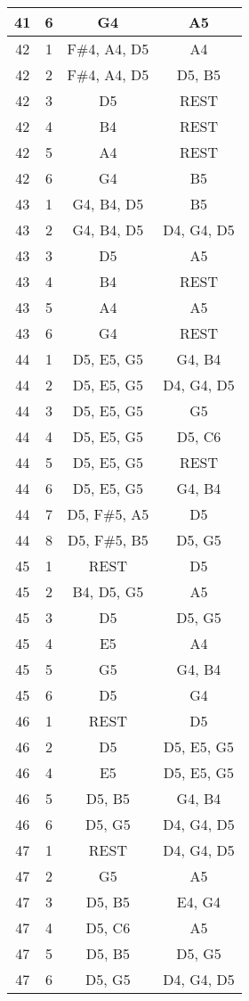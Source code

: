 \documentclass{article}
\begin{document}
\begin{longtable}{|c|c|c|c|}
41 & 6 & G4 & A5 \\ 
\hline
42 & 1 & F\#4, A4, D5 & A4 \\ 
42 & 2 & F\#4, A4, D5 & D5, B5 \\ 
42 & 3 & D5 & REST \\ 
42 & 4 & B4 & REST \\ 
42 & 5 & A4 & REST \\ 
42 & 6 & G4 & B5 \\ 
\hline
43 & 1 & G4, B4, D5 & B5 \\ 
43 & 2 & G4, B4, D5 & D4, G4, D5 \\ 
43 & 3 & D5 & A5 \\ 
43 & 4 & B4 & REST \\ 
43 & 5 & A4 & A5 \\ 
43 & 6 & G4 & REST \\ 
\hline
44 & 1 & D5, E5, G5 & G4, B4 \\ 
44 & 2 & D5, E5, G5 & D4, G4, D5 \\ 
44 & 3 & D5, E5, G5 & G5 \\ 
44 & 4 & D5, E5, G5 & D5, C6 \\ 
44 & 5 & D5, E5, G5 & REST \\ 
44 & 6 & D5, E5, G5 & G4, B4 \\ 
44 & 7 & D5, F\#5, A5 & D5 \\ 
44 & 8 & D5, F\#5, B5 & D5, G5 \\ 
\hline
45 & 1 & REST & D5 \\ 
45 & 2 & B4, D5, G5 & A5 \\ 
45 & 3 & D5 & D5, G5 \\ 
45 & 4 & E5 & A4 \\ 
45 & 5 & G5 & G4, B4 \\ 
45 & 6 & D5 & G4 \\ 
\hline
46 & 1 & REST & D5 \\ 
46 & 2 & D5 & D5, E5, G5 \\ 
46 & 4 & E5 & D5, E5, G5 \\ 
46 & 5 & D5, B5 & G4, B4 \\ 
46 & 6 & D5, G5 & D4, G4, D5 \\ 
\hline
47 & 1 & REST & D4, G4, D5 \\ 
47 & 2 & G5 & A5 \\ 
47 & 3 & D5, B5 & E4, G4 \\ 
47 & 4 & D5, C6 & A5 \\ 
47 & 5 & D5, B5 & D5, G5 \\ 
47 & 6 & D5, G5 & D4, G4, D5 \\ 

\end{longtable}
\end{document}
